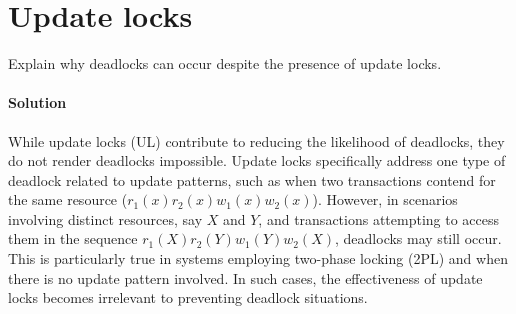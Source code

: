 \section{Update locks}

Explain why deadlocks can occur despite the presence of update locks. 

\paragraph*{Solution}
While update locks (UL) contribute to reducing the likelihood of deadlocks, they do not render deadlocks impossible.
Update locks specifically address one type of deadlock related to update patterns, such as when two transactions contend for the same resource ($r_1(x) r_2(x) w_1(x) w_2(x)$). 
However, in scenarios involving distinct resources, say $X$ and $Y$, and transactions attempting to access them in the sequence $r_1(X) r_2(Y) w_1(Y) w_2(X)$, deadlocks may still occur.
This is particularly true in systems employing two-phase locking (2PL) and when there is no update pattern involved.
In such cases, the effectiveness of update locks becomes irrelevant to preventing deadlock situations.